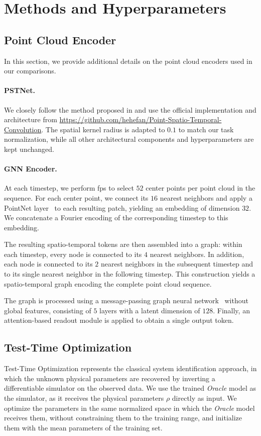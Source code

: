 \section{Methods and Hyperparameters} \label{app:methods}

\subsection{Point Cloud Encoder} \label{app:pc_encoder}
In this section, we provide additional details on the point cloud encoders used in our comparisons.
\paragraph{PSTNet.}
We closely follow the method proposed in \citep{fan2021pstnet} and use the official implementation and architecture from \url{https://github.com/hehefan/Point-Spatio-Temporal-Convolution}. The spatial kernel radius is adapted to $0.1$ to match our task normalization, while all other architectural components and hyperparameters are kept unchanged.

\paragraph{GNN Encoder.}
At each timestep, we perform \gls{fps} to select $52$ center points per point cloud in the sequence. For each center point, we connect its $16$ nearest neighbors and apply a PointNet layer~\citep{qi2016pointnet} to each resulting patch, yielding an embedding of dimension $32$. We concatenate a Fourier encoding of the corresponding timestep to this embedding.

The resulting spatio-temporal tokens are then assembled into a graph: within each timestep, every node is connected to its $4$ nearest neighbors. In addition, each node is connected to its $2$ nearest neighbors in the subsequent timestep and to its single nearest neighbor in the following timestep. This construction yields a spatio-temporal graph encoding the complete point cloud sequence.

The graph is processed using a message-passing graph neural network~\citep{sanchezgonzalez2020learning} without global features, consisting of $5$ layers with a latent dimension of $128$. Finally, an attention-based readout module is applied to obtain a single output token.

\subsection{Test-Time Optimization}
\label{app:tto}
Test-Time Optimization represents the classical system identification approach, in which the unknown physical parameters are recovered by inverting a differentiable simulator on the observed data. We use the trained \textit{Oracle} model as the simulator, as it receives the physical parameters $\rho$ directly as input. We optimize the parameters in the same normalized space in which the \textit{Oracle} model receives them, without constraining them to the training range, and initialize them with the mean parameters of the training set.

